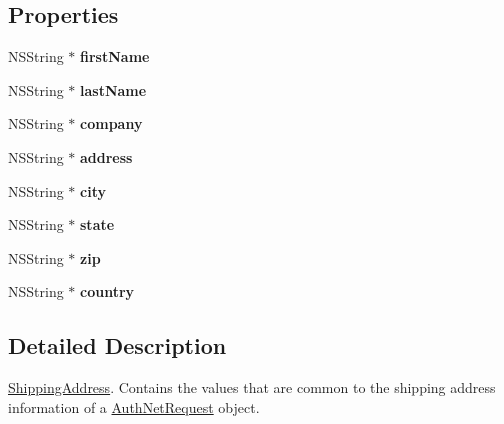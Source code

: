 \subsection*{Properties}
\begin{DoxyCompactItemize}
\item 
\hypertarget{interface_shipping_address_aab8b9e8039c9447fb70a08cdee7c595d}{
NSString $\ast$ {\bfseries firstName}}
\label{interface_shipping_address_aab8b9e8039c9447fb70a08cdee7c595d}

\item 
\hypertarget{interface_shipping_address_a1b5111270e6cbff86f13d85bf1b18272}{
NSString $\ast$ {\bfseries lastName}}
\label{interface_shipping_address_a1b5111270e6cbff86f13d85bf1b18272}

\item 
\hypertarget{interface_shipping_address_a66bbde6231dcb0b7568545f86fd60053}{
NSString $\ast$ {\bfseries company}}
\label{interface_shipping_address_a66bbde6231dcb0b7568545f86fd60053}

\item 
\hypertarget{interface_shipping_address_a1c91e78ea37fb9c1ba2bcbc1979f9bef}{
NSString $\ast$ {\bfseries address}}
\label{interface_shipping_address_a1c91e78ea37fb9c1ba2bcbc1979f9bef}

\item 
\hypertarget{interface_shipping_address_adb83655fed6a4f5b34015465ed3cb58a}{
NSString $\ast$ {\bfseries city}}
\label{interface_shipping_address_adb83655fed6a4f5b34015465ed3cb58a}

\item 
\hypertarget{interface_shipping_address_aeb8588ae00dd1d5e316923395aa9d030}{
NSString $\ast$ {\bfseries state}}
\label{interface_shipping_address_aeb8588ae00dd1d5e316923395aa9d030}

\item 
\hypertarget{interface_shipping_address_a430d4d959763dbcd5dfe1889352b6381}{
NSString $\ast$ {\bfseries zip}}
\label{interface_shipping_address_a430d4d959763dbcd5dfe1889352b6381}

\item 
\hypertarget{interface_shipping_address_a14f2feedbd4f6a0b96b3c4bab454caa8}{
NSString $\ast$ {\bfseries country}}
\label{interface_shipping_address_a14f2feedbd4f6a0b96b3c4bab454caa8}

\end{DoxyCompactItemize}


\subsection{Detailed Description}
\hyperlink{interface_shipping_address}{ShippingAddress}. Contains the values that are common to the shipping address information of a \hyperlink{interface_auth_net_request}{AuthNetRequest} object. 

